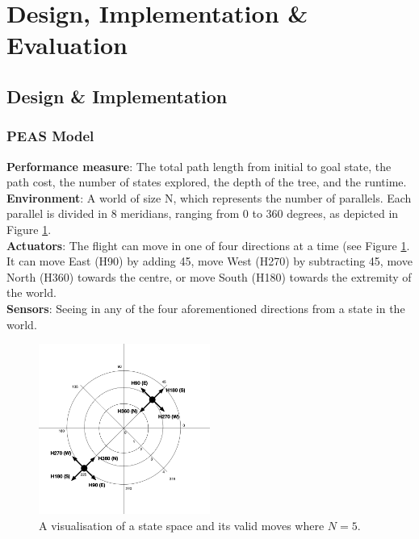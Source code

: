 \documentclass[letterpaper,12pt]{article}
\begin{document}

\newpage
\section{Design, Implementation \& Evaluation}
\label{sec:design-implementation-evaluation}

\subsection{Design \& Implementation}

\subsubsection{PEAS Model}

\textbf{Performance measure}: The total path length from initial to goal state, the path cost, the number of states explored, the depth of the tree, and the runtime.\\

\textbf{Environment}: A world of size N, which represents the number of parallels. Each parallel is divided in 8 meridians, ranging from 0 to 360 degrees, as depicted in Figure \ref{fig:map}.\\

\textbf{Actuators}: The flight can move in one of four directions at a time (see Figure \ref{fig:map}. It can move East (H90) by adding 45\degree, move West (H270) by subtracting 45\degree, move North (H360) towards the centre, or move South (H180) towards the extremity of the world.\\

\textbf{Sensors}: Seeing in any of the four aforementioned directions from a state in the world.

\begin{figure}[ht]
\centering
\includegraphics[width=0.5\textwidth]{report/figures/map.png}
\caption{\label{fig:map}A visualisation of a state space and its valid moves where $N=5$.}
\end{figure}
\end{document}
